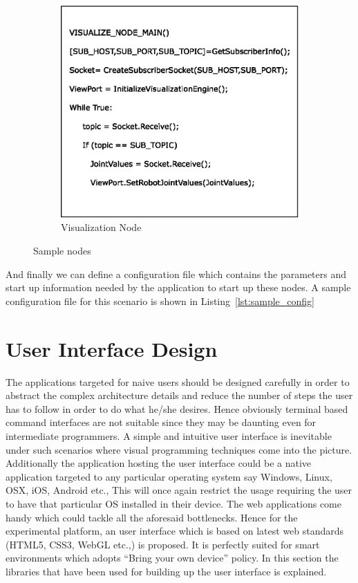 \begin{figure}[H]
\begin{subfigure}[t]{0.48\textwidth}
\includegraphics[width=\textwidth]{assets/sample_node_B.eps}
\caption[Visualization Node]{Visualization Node}
\label{fig:node_b}
\end{subfigure}
\caption[Sample nodes]{Sample nodes}
\label{fig:pseudo_nodes}
\end{figure}
And finally we can define a configuration file which contains the parameters and start up information needed by the application to start up these nodes. A sample configuration file for this scenario is shown in Listing~\ref{lst:sample_config}



\section{User Interface Design}

The applications targeted for naive users should be designed carefully in order to abstract the complex architecture details and reduce the number of steps the user has to follow in order to do what he/she desires. Hence obviously terminal based command interfaces are not suitable since they may be daunting even for intermediate programmers. A simple and intuitive user interface is inevitable under such scenarios where visual programming techniques come into the picture. Additionally the application hosting the user interface could be a native application targeted to any particular operating system say Windows, Linux, OSX, iOS, Android etc., This will once again restrict the usage requiring the user to have that particular OS installed in their device. The web applications come handy which could tackle all the aforesaid bottlenecks. Hence for the experimental platform, an user interface which is based on latest web standards (HTML5, CSS3, WebGL etc.,) is proposed. It is perfectly suited for smart environments which adopts ``Bring your own device'' policy. In this section the libraries that have been used for building up the user interface is explained.

